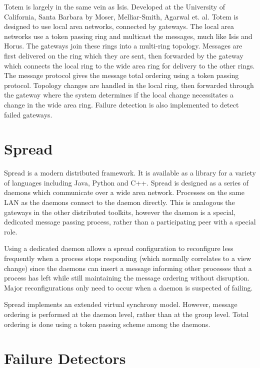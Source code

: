 Totem\cite{TOTEMTOOLKIT} is largely in the same vein as Isis. Developed at the University of
California, Santa Barbara by Moser, Melliar-Smith, Agarwal et. al. Totem is
designed to use local area networks, connected by gateways. The local area
networks use a token passing ring and multicast the messages, much like Isis
and Horus. The gateways join these rings into a multi-ring topology. Messages
are first delivered on the ring which they are sent, then forwarded by the
gateway which connects the local ring to the wide area ring for delivery to
the other rings. The message protocol gives the message total ordering using a
token passing protocol. Topology changes are handled in the local ring, then
forwarded through the gateway where the system determines if the local change
necessitates a change in the wide area ring. Failure detection is also implemented
to detect failed gateways.

\section{Spread}

Spread\cite{SPREADTOOLKIT} is a modern distributed framework. It is available as a library for a
variety of languages including Java, Python and C++. Spread is designed as a
series of daemons which communicate over a wide area network. Processes on the
same LAN as the daemons connect to the daemon directly. This is analogous the
gateways in the other distributed toolkits, however the daemon is a special,
dedicated message passing process, rather than a participating peer with a
special role.

Using a dedicated daemon allows a spread configuration to reconfigure less
frequently when a process stops responding (which normally correlates to a
view change) since the daemons can insert a message informing other processes
that a process has left while still maintaining the message ordering without
disruption. Major reconfigurations only need to occur when a daemon is
suspected of failing.

Spread implements an extended virtual synchrony model. However, message
ordering is performed at the daemon level, rather than at the group level.
Total ordering is done using a token passing scheme among the daemons.

\section{Failure Detectors}

